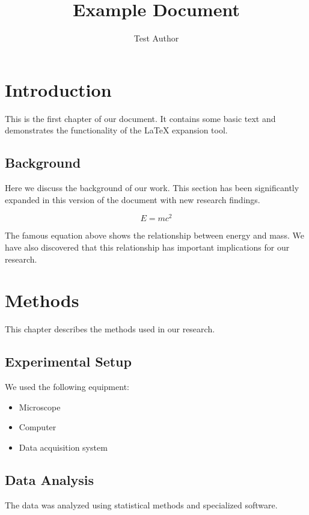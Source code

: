\documentclass{article}
\title{Example Document}
\author{Test Author}
\begin{document}
\maketitle

\section{Introduction}

This is the first chapter of our document. It contains some basic text
and demonstrates the functionality of the LaTeX expansion tool.

\subsection{Background}

Here we discuss the background of our work. This section has been significantly
expanded in this version of the document with new research findings.


\begin{equation}
E = mc^2
\end{equation}

The famous equation above shows the relationship between energy and mass.
We have also discovered that this relationship has important implications
for our research.

\section{Methods}

This chapter describes the methods used in our research.

\subsection{Experimental Setup}

We used the following equipment:
\begin{itemize}
\item Microscope
\item Computer
\item Data acquisition system
\end{itemize}

\subsection{Data Analysis}

The data was analyzed using statistical methods and specialized software.
\end{document}
